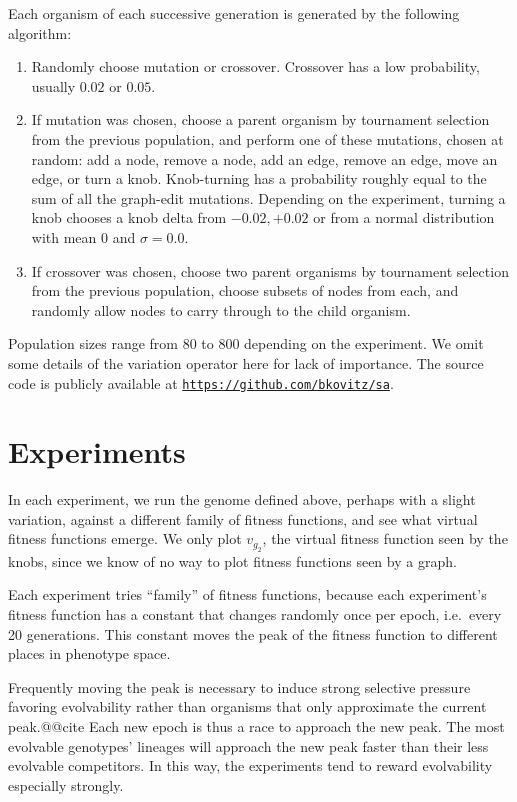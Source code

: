 \documentclass[letterpaper]{article}
\begin{document}
Each organism of each successive generation is generated by the following
algorithm:
\begin{enumerate}
  \item Randomly choose mutation or crossover. Crossover has a low probability,
    usually $0.02$ or $0.05$.
  \item If mutation was chosen, choose a parent organism by tournament selection
    from the previous population, and perform one of these mutations, chosen at
    random: add a node, remove a node, add an edge, remove an edge, move an
    edge, or turn a knob. Knob-turning has a probability roughly equal to the
    sum of all the graph-edit mutations. Depending on the experiment, turning a
    knob chooses a knob delta from ${-0.02, +0.02}$ or from a normal
    distribution with mean 0 and $\sigma = 0.0$.
  \item If crossover was chosen, choose two parent organisms by tournament
    selection from the previous population, choose subsets of nodes from each,
    and randomly allow nodes to carry through to the child organism.
\end{enumerate}
Population sizes range from 80 to 800 depending on the experiment. We omit some
details of the variation operator here for lack of importance. The source code
is publicly available at
\href{https://github.com/bkovitz/sa}{\texttt{https://github.com/bkovitz/sa}}.

\section{Experiments}

In each experiment, we run the genome defined above, perhaps with a slight
variation, against a different family of fitness functions, and see what
virtual fitness functions emerge. We only plot $v_{g_2}$, the virtual
fitness function seen by the knobs, since we know of no way to plot fitness
functions seen by a graph.

Each experiment tries ``family'' of fitness functions, because each experiment's
fitness function has a constant that changes randomly once per epoch, i.e.~every
20 generations. This constant moves the peak of the fitness function to
different places in phenotype space.

Frequently moving the peak is necessary to induce strong selective pressure
favoring evolvability rather than organisms that only approximate the current
peak.@@cite Each new epoch is thus a race to approach the new peak. The most
evolvable genotypes' lineages will approach the new peak faster than their
less evolvable competitors. In this way, the experiments tend to reward
evolvability especially strongly.
\end{document}
